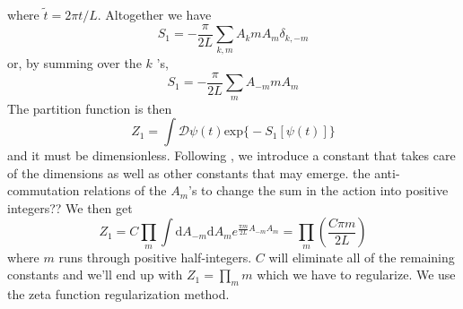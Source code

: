 \documentclass[12pt,a4paper]{article}
\begin{document}
where $ \tilde{t}=2 \pi t/L $. Altogether we have
\begin{equation}
	S_1 = - \frac{ \pi  }{ 2L } \sum_{k,m}^{} A_k m A_m \delta _{ k,-m } 
\end{equation}
or, by summing over the $ k $ 's,
\begin{equation}
	S_1 = - \frac{ \pi  }{ 2L } \sum_{m}^{} A _{ -m } m A_m
\end{equation}
The partition function is then
\begin{equation*}
	Z_1 = \int \mathcal{ D } \psi (t) \text{exp} \big\{- S_{1}[ \psi (t)]\big\}  
\end{equation*}
and it must be dimensionless. Following \cite{PhilipBoyleSmith2021}, we introduce a constant that takes care of the dimensions as well as  other constants that may emerge. {\color{red} the anti-commutation relations of the $ A_m $'s to change the sum in the action into positive integers??} We then get
\begin{equation}
	Z_1 = C \prod_m \int \mathrm{d} A _{ -m } \mathrm{d} A_m e ^{ \frac{ \pi m }{ 2L } A _{ -m } A_m } = \prod_m \left( \frac{ C \pi m }{ 2 L }  \right)
	\label{eqn:partition}
\end{equation}
where $ m $ runs through positive half-integers. $ C $ will eliminate all of the remaining constants and we'll end up with $Z_1 = \prod _m m $ which we have to regularize. We  use the zeta function regularization method.
\end{document}
